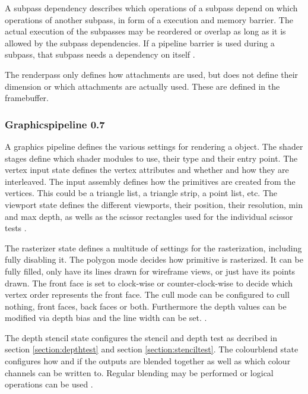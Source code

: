 A subpass dependency describes which operations of a subpass depend on which operations of another subpass, in form of a execution and memory barrier. The actual execution of the subpasses may be reordered or overlap as long as it is allowed by the subpass dependencies. If a pipeline barrier is used during a subpass, that subpass needs a dependency on itself \cite{khronos:vulkan:spec1.1}.

The renderpass only defines how attachments are used, but does not define their dimension or which attachments are actually used. These are defined in the framebuffer. 


\subsubsection{Graphicspipeline 0.7}
A graphics pipeline defines the various settings for rendering a object. The shader stages define which shader modules to use, their type and their entry point. The vertex input state defines the vertex attributes and whether and how they are interleaved. The input assembly defines how the primitives are created from the vertices. This could be a triangle list, a triangle strip, a point list, etc. The viewport state defines the different viewports, their position, their resolution, min and max depth, as wells as the scissor rectangles used for the individual scissor tests \cite{khronos:vulkan:spec1.1}.

The rasterizer state defines a multitude of settings for the rasterization, including fully disabling it. The polygon mode decides how primitive is rasterized. It can be fully filled, only have its lines drawn for wireframe views, or just have its points drawn. The front face is set to clock-wise or counter-clock-wise to decide which vertex order represents the front face. The cull mode can be configured to cull nothing, front faces, back faces or both. Furthermore the depth values can be modified via depth bias and the line width can be set. \cite{khronos:vulkan:spec1.1}.

The depth stencil state configures the stencil and depth test as decribed in section \ref{section:depthtest} and section \ref{section:stenciltest}. The colourblend state configures how and if the outputs are blended together as well as which colour channels can be written to. Regular blending may be performed or logical operations can be used \cite{khronos:vulkan:spec1.1}.

